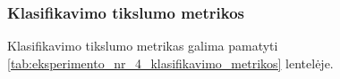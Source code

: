 \subsubsection{Klasifikavimo tikslumo metrikos}
\label{subsubsec:eksperimentas_nr_4_klasifikacijos_tikslumo_metrikos}

Klasifikavimo tikslumo metrikas galima pamatyti \ref{tab:eksperimento_nr_4_klasifikavimo_metrikos} lentelėje.


